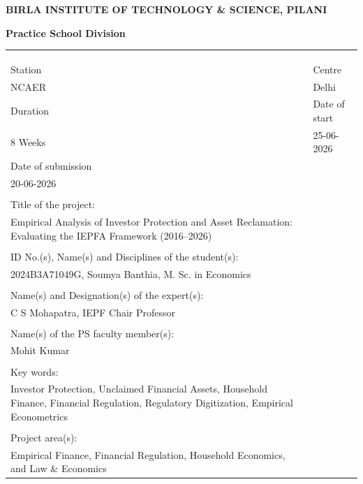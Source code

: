 \documentclass[openany]{book}
\begin{document}
\thispagestyle{empty}

	\centerline{\bf BIRLA INSTITUTE OF TECHNOLOGY \& SCIENCE, PILANI}
	\vspace*{0.2cm}
	\centerline{\bf Practice School Division}
	\vspace*{0.3cm}
	{\bf 
		\begin{tabular}{p{6cm}l}
			& \\
			& \\
			& \\
			Station & \hspace*{3cm} Centre \\  NCAER & \hspace*{3cm} Delhi
			& \\
			Duration &\hspace*{3cm} Date of start \\ 8 Weeks & \hspace*{3cm} 25-06-2026
			& \\
			Date of submission & {} \\  20-06-2026 \\
			& \\
			Title of the project: & \\ \parbox[t]{15 cm} {Empirical Analysis of Investor Protection and Asset Reclamation: Evaluating the IEPFA Framework (2016--2026)} \\
			& \\
			ID No.(s), Name(s) and Disciplines of the student(s): & \\ \parbox[t]{15 cm} {2024B3A71049G, Soumya Banthia, M. Sc. in Economics} \\
            & \\
			Name(s) and Designation(s) of the expert(s): & \\ \parbox[t]{15 cm} {C S Mohapatra, IEPF Chair Professor} \\
			& \\ 
			Name(s) of the PS faculty member(s): & \\ Mohit Kumar \\
            & \\ 
			Key words: & \\ \parbox[t]{15 cm} {Investor Protection, Unclaimed Financial Assets, Household Finance, Financial Regulation, Regulatory Digitization, Empirical Econometrics} \\
			& \\
			Project area(s):  & \\ \parbox[t]{15 cm} {Empirical Finance, Financial Regulation, Household Economics, and Law \& Economics}\\

\end{tabular}}
\end{document}
